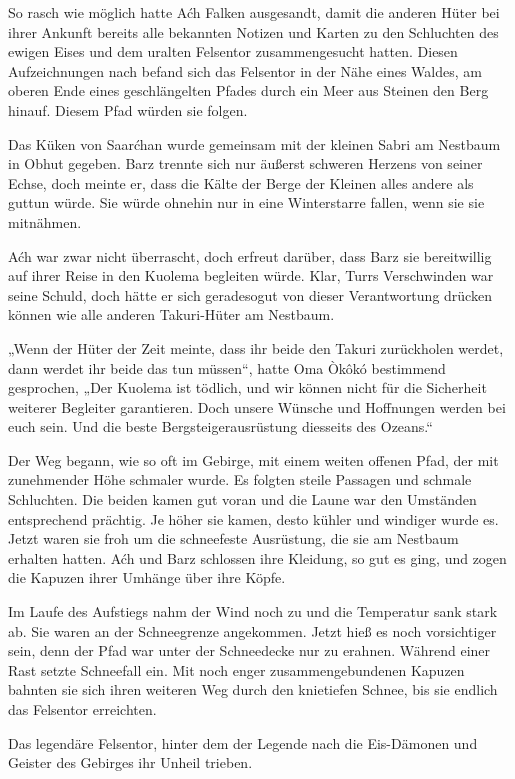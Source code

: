 So rasch wie möglich hatte Aćh Falken ausgesandt, damit die anderen Hüter bei ihrer Ankunft bereits alle bekannten Notizen und Karten zu den Schluchten des ewigen Eises und dem uralten Felsentor zusammengesucht hatten. Diesen Aufzeichnungen nach befand sich das Felsentor in der Nähe eines Waldes, am oberen Ende eines geschlängelten Pfades durch ein Meer aus Steinen den Berg hinauf. Diesem Pfad würden sie folgen.

Das Küken von Saarćhan wurde gemeinsam mit der kleinen Sabri am Nestbaum in Obhut gegeben. Barz trennte sich nur äußerst schweren Herzens von seiner Echse, doch meinte er, dass die Kälte der Berge der Kleinen alles andere als guttun würde. Sie würde ohnehin nur in eine Winterstarre fallen, wenn sie sie mitnähmen.

Aćh war zwar nicht überrascht, doch erfreut darüber, dass Barz sie bereitwillig auf ihrer Reise in den Kuolema begleiten würde. Klar, Turrs Verschwinden war seine Schuld, doch hätte er sich geradesogut von dieser Verantwortung drücken können wie alle anderen Takuri-Hüter am Nestbaum.

„Wenn der Hüter der Zeit meinte, dass ihr beide den Takuri zurückholen werdet, dann werdet ihr beide das tun müssen“, hatte Oma Òkôkó bestimmend gesprochen, „Der Kuolema ist tödlich, und wir können nicht für die Sicherheit weiterer Begleiter garantieren. Doch unsere Wünsche und Hoffnungen werden bei euch sein. Und die beste Bergsteigerausrüstung diesseits des Ozeans.“

Der Weg begann, wie so oft im Gebirge, mit einem weiten offenen Pfad, der mit zunehmender Höhe schmaler wurde. Es folgten steile Passagen und schmale Schluchten. Die beiden kamen gut voran und die Laune war den Umständen entsprechend prächtig. Je höher sie kamen, desto kühler und windiger wurde es. Jetzt waren sie froh um die schneefeste Ausrüstung, die sie am Nestbaum erhalten hatten. Aćh und Barz schlossen ihre Kleidung, so gut es ging, und zogen die Kapuzen ihrer Umhänge über ihre Köpfe.

Im Laufe des Aufstiegs nahm der Wind noch zu und die Temperatur sank stark ab. Sie waren an der Schneegrenze angekommen. Jetzt hieß es noch vorsichtiger sein, denn der Pfad war unter der Schneedecke nur zu erahnen. Während einer Rast setzte Schneefall ein. Mit noch enger zusammengebundenen Kapuzen bahnten sie sich ihren weiteren Weg durch den knietiefen Schnee, bis sie endlich das Felsentor erreichten.

Das legendäre Felsentor, hinter dem der Legende nach die Eis-Dämonen und Geister des Gebirges ihr Unheil trieben.


